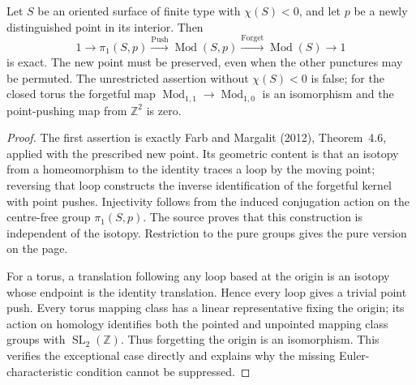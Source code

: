 \begin{proposition}
\label{A:Birman}
Let $S$ be an oriented surface of finite type with $\chi(S)<0$,
and let $p$ be a newly distinguished point in its interior. Then
\[
 1\longrightarrow\pi_1(S,p)\stackrel{\mathrm{Push}}\longrightarrow
 \operatorname{Mod}(S,p)\stackrel{\mathrm{Forget}}\longrightarrow
 \operatorname{Mod}(S)\longrightarrow1
\]
is exact. The new point must be preserved, even when the other
punctures may be permuted. The unrestricted assertion without
$\chi(S)<0$ is false; for the closed torus the forgetful map
$\operatorname{Mod}_{1,1}\to\operatorname{Mod}_{1,0}$ is an
isomorphism and the point-pushing map from $\mathbb Z^2$ is zero.
\end{proposition}

\begin{proof}
The first assertion is exactly Farb and Margalit (2012),
Theorem~4.6, applied with the prescribed new point. Its geometric
content is that an isotopy from a homeomorphism to the identity
traces a loop by the moving point; reversing that loop constructs
the inverse identification of the forgetful kernel with point
pushes. Injectivity follows from the induced conjugation action
on the centre-free group $\pi_1(S,p)$. The source proves that this
construction is independent of the isotopy. Restriction to the
pure groups gives the pure version on the page.

For a torus, a translation following any loop based at the origin
is an isotopy whose endpoint is the identity translation. Hence
every loop gives a trivial point push. Every torus mapping class
has a linear representative fixing the origin; its action on
homology identifies both the pointed and unpointed mapping class
groups with $\operatorname{SL}_2(\mathbb Z)$. Thus forgetting the
origin is an isomorphism. This verifies the exceptional case
directly and explains why the missing Euler-characteristic
condition cannot be suppressed.
\end{proof}

